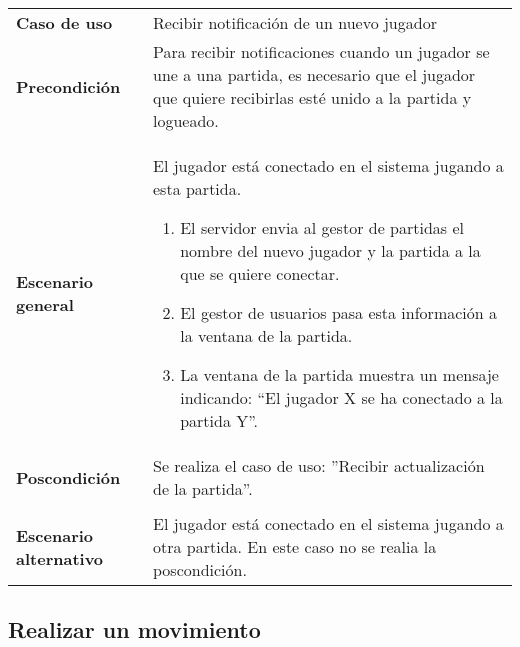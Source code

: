{\footnotesize
\begin{tabularx}{0.95\textwidth}{p{}|X}

\textbf{Caso de uso} & Recibir notificación de un nuevo jugador \\

\textbf{Precondición} & Para recibir notificaciones cuando un jugador se une a
una partida, es necesario que el jugador que quiere recibirlas esté unido a la
partida y logueado. \\

\textbf{Escenario general} & El jugador está conectado en el sistema jugando a
esta partida.\begin{enumerate}

\item El servidor envia al gestor de partidas el nombre del nuevo jugador y la
partida a la que se quiere conectar.
\item El gestor de usuarios pasa esta información a la ventana de la partida.
\item La ventana de la partida muestra un mensaje indicando: ``El jugador X se
ha conectado a la partida Y''.

\end{enumerate} \\

\textbf{Poscondición} & Se realiza el caso de uso: ''Recibir actualización de la
partida''. \\ \\

\textbf{Escenario alternativo} & El jugador está conectado en el sistema jugando
a otra partida. En este caso no se realia la poscondición.





\end{tabularx}
}

\subsection{Realizar un movimiento}

